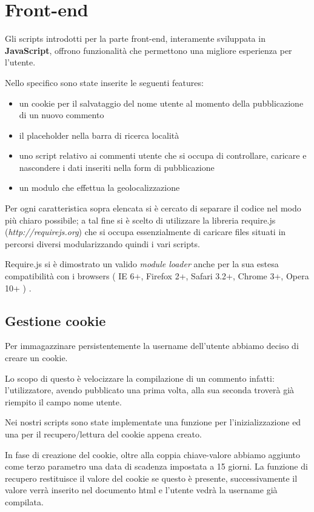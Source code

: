 \section{Front-end}
Gli scripts introdotti per la parte front-end, interamente sviluppata in \textbf{JavaScript}, offrono funzionalità che permettono una migliore esperienza per l'utente.


Nello specifico sono state inserite le seguenti features:
\begin {itemize}
\item un cookie per il salvataggio del nome utente al momento della pubblicazione di un nuovo commento
\item il placeholder nella barra di ricerca località
\item uno script relativo ai commenti utente che si occupa di controllare, caricare e nascondere i dati inseriti nella form di pubblicazione 
\item un modulo che effettua la geolocalizzazione 
\end {itemize} 
Per ogni caratteristica sopra elencata si è cercato di separare il codice nel modo più chiaro possibile; a tal fine si è scelto di utilizzare la libreria require.js (\textit{http://requirejs.org}) che si occupa essenzialmente di caricare files situati in percorsi diversi modularizzando quindi i vari scripts.


Require.js si è dimostrato un valido \textit{module loader} anche per la sua estesa compatibilità con i browsers ( IE 6+, Firefox 2+, Safari 3.2+, Chrome 3+, Opera 10+ ) .

\subsection{Gestione cookie}
Per immagazzinare persistentemente la username dell'utente abbiamo deciso di creare un cookie. 

Lo scopo di questo è velocizzare la compilazione di un commento infatti: l'utilizzatore, avendo pubblicato una prima volta, alla sua seconda troverà già riempito il campo nome utente.
 
Nei nostri scripts sono state implementate una funzione per l'inizializzazione ed una per il recupero/lettura del cookie appena creato.


In fase di creazione del cookie, oltre alla coppia chiave-valore abbiamo aggiunto come terzo parametro una data di scadenza impostata a 15 giorni.
La funzione di recupero restituisce il valore del cookie se questo è presente, successivamente il valore verrà inserito nel documento html e l'utente vedrà la username già compilata.


